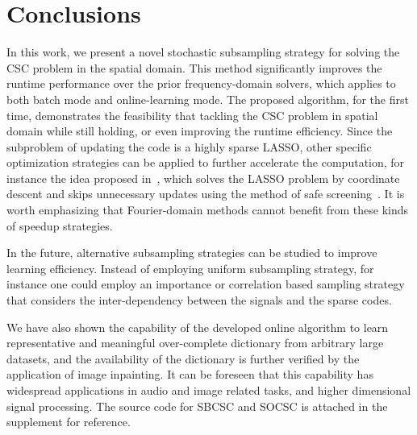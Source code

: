 \section{Conclusions}
In this work, we present a novel stochastic subsampling strategy for
solving the CSC problem in the spatial domain. This method
significantly improves the runtime performance over the prior
frequency-domain solvers, which applies to both batch mode and
online-learning mode.  The proposed algorithm, for the first time,
demonstrates the feasibility that tackling the CSC problem in spatial
domain while still holding, or even improving the runtime
efficiency. Since the subproblem of updating the code is a highly
sparse LASSO, other specific optimization strategies can be applied to
further accelerate the computation, for instance the idea proposed
in~\cite{johnson2017stingycd}, which solves the LASSO problem by
coordinate descent and skips unnecessary updates using the method of
safe screening~\cite{ghaoui2012Swfe}. It is worth emphasizing that
Fourier-domain methods cannot benefit from these kinds of speedup
strategies.

In the future, alternative subsampling strategies can be studied to
improve learning efficiency. Instead of employing uniform subsampling
strategy, for instance one could employ an importance or correlation
based sampling strategy that considers the inter-dependency between the
signals and the sparse codes.

We have also shown the capability of the developed online algorithm to
learn representative and meaningful over-complete dictionary from
arbitrary large datasets, and the availability of the dictionary is
further verified by the application of image inpainting. It can be
foreseen that this capability has widespread applications in audio
and image related tasks, and higher dimensional signal processing. The
source code for SBCSC and SOCSC is attached in the supplement for
reference.



